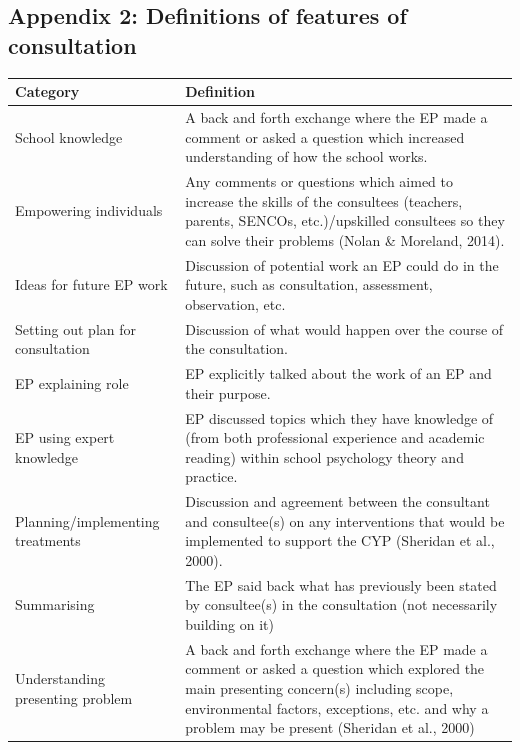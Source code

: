 \documentclass[
  english,
  man,floatsintext]{apa6}
\begin{document}
\newpage

\hypertarget{appendix-2-definitions-of-features-of-consultation}{%
\subsection{Appendix 2: Definitions of features of consultation}\label{appendix-2-definitions-of-features-of-consultation}}

\begin{longtable}[]{@{}
  >{\raggedright\arraybackslash}p{}
  >{\raggedright\arraybackslash}p{}@{}}
\toprule
Category & Definition \\
\midrule
\endhead
School knowledge & A back and forth exchange where
the EP made a comment or asked a
question which increased
understanding of how the school
works. \\
Empowering individuals & Any comments or questions which
aimed to increase the skills of
the consultees (teachers, parents,
SENCOs, etc.)/upskilled consultees
so they can solve their problems
(Nolan \& Moreland, 2014). \\
Ideas for future EP work & Discussion of potential work an EP
could do in the future, such as
consultation, assessment,
observation, etc. \\
Setting out plan for
consultation & Discussion of what would happen
over the course of the
consultation. \\
EP explaining role & EP explicitly talked about the
work of an EP and their purpose. \\
EP using expert knowledge & EP discussed topics which they
have knowledge of (from both
professional experience and
academic reading) within school
psychology theory and practice. \\
Planning/implementing
treatments & Discussion and agreement between
the consultant and consultee(s) on
any interventions that would be
implemented to support the CYP
(Sheridan et al., 2000). \\
Summarising & The EP said back what has
previously been stated by
consultee(s) in the consultation
(not necessarily building on it) \\
Understanding presenting
problem & A back and forth exchange where
the EP made a comment or asked a
question which explored the
main presenting concern(s)
including scope, environmental
factors, exceptions, etc. and why
a problem may be present
(Sheridan et al., 2000) \\

\end{longtable}
\end{document}
